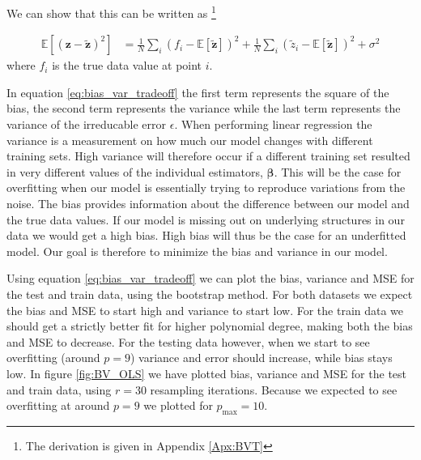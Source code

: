 \documentclass[reprint,english,notitlepage,aps,nobalancelastpage,nofootinbib]{revtex4-1}  %
\newcommand{\expz}{\mathbb{E}[\mathbf{\tilde{z}}]}
\begin{document}
We can show that this can be written as \footnote{The derivation is given in Appendix \ref{Apx:BVT}}

\begin{align}
\label{eq:bias_var_tradeoff}
  \mathbb{E}[(\mathbf{z}-\mathbf{\tilde{z}})^2] &= \frac{1}{N}\sum_i (f_i - \expz)^2 + \frac{1}{N}\sum_i (\tilde{z}_i - \expz)^2 + \sigma^2
\end{align}
where $f_i$ is the true data value at point $i$.

In equation \eqref{eq:bias_var_tradeoff} the first term represents the square of the bias, the second term represents the variance while the last term represents the variance of the irreducable error $\epsilon$. When performing linear regression the variance is a measurement on how much our model changes with different training sets. High variance will therefore occur if a different training set resulted in very different values of the individual estimators, $\bm{\beta}$. This will be the case for overfitting when our model is essentially trying to reproduce variations from the noise. The bias provides information about the difference between our model and the true data values. If our model is missing out on underlying structures in our data we would get a high bias. High bias will thus be the case for an underfitted model. Our goal is therefore to minimize the bias and variance in our model.

Using equation \eqref{eq:bias_var_tradeoff} we can plot the bias, variance and MSE for the test and train data, using the bootstrap method. For both datasets we expect the bias and MSE to start high and variance to start low. For the train data we should get a strictly better fit for higher polynomial degree, making both the bias and MSE to decrease. For the testing data however, when we start to see overfitting (around $p=9$) variance and error should increase, while bias stays low. In figure \ref{fig:BV_OLS} we have plotted bias, variance and MSE for the test and train data, using $r = 30$ resampling iterations. Because we expected to see overfitting at around $p=9$ we plotted for $p_\text{max} = 10$.
\end{document}
